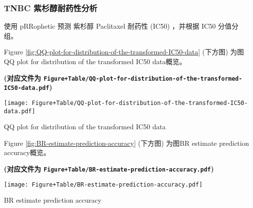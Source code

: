 \documentclass[
]{article}
\begin{document}
\begin{center}\vspace{1.5cm}\end{center}

\hypertarget{tnbc-ux7d2bux6749ux9187ux8010ux836fux6027ux5206ux6790}{%
\subsubsection{TNBC 紫杉醇耐药性分析}\label{tnbc-ux7d2bux6749ux9187ux8010ux836fux6027ux5206ux6790}}

使用 pRRophetic 预测 紫杉醇 Paclitaxel 耐药性 (IC50) ，并根据 IC50 分值分组。

\begin{center}\vspace{1.5cm}\end{center}

Figure \ref{fig:QQ-plot-for-distribution-of-the-transformed-IC50-data} (下方图) 为图QQ plot for distribution of the transformed IC50 data概览。

\textbf{(对应文件为 \texttt{Figure+Table/QQ-plot-for-distribution-of-the-transformed-IC50-data.pdf})}

\def\@captype{figure}
\begin{center}
\texttt{[image: Figure+Table/QQ-plot-for-distribution-of-the-transformed-IC50-data.pdf]}
\caption{QQ plot for distribution of the transformed IC50 data}\label{fig:QQ-plot-for-distribution-of-the-transformed-IC50-data}
\end{center}

\begin{center}\vspace{1.5cm}\end{center}

\begin{center}\vspace{1.5cm}\end{center}

Figure \ref{fig:BR-estimate-prediction-accuracy} (下方图) 为图BR estimate prediction accuracy概览。

\textbf{(对应文件为 \texttt{Figure+Table/BR-estimate-prediction-accuracy.pdf})}

\def\@captype{figure}
\begin{center}
\texttt{[image: Figure+Table/BR-estimate-prediction-accuracy.pdf]}
\caption{BR estimate prediction accuracy}\label{fig:BR-estimate-prediction-accuracy}
\end{center}
\end{document}
